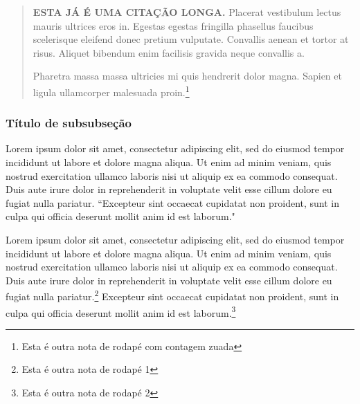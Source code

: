 \documentclass[12pt]{article}
\begin{document}
			\begin{quotation}
				\textbf{ESTA JÁ É UMA CITAÇÃO LONGA.} Placerat vestibulum lectus mauris ultrices eros in. Egestas egestas fringilla phasellus faucibus scelerisque eleifend donec pretium vulputate. Convallis aenean et tortor at risus. Aliquet bibendum enim facilisis gravida neque convallis a. 
				
				Pharetra massa massa ultricies mi quis hendrerit dolor magna. Sapien et ligula ullamcorper malesuada proin.\footnote[516]{Esta é outra nota de rodapé com contagem zuada}
			\end{quotation}
		
			\subsubsection{Título de subsubseção}
				Lorem ipsum dolor sit amet, consectetur adipiscing elit, sed do eiusmod tempor incididunt ut labore et dolore magna aliqua. Ut enim ad minim veniam, quis nostrud exercitation ullamco laboris nisi ut aliquip ex ea commodo consequat. Duis aute irure dolor in reprehenderit in voluptate velit esse cillum dolore eu fugiat nulla pariatur. ``Excepteur sint occaecat cupidatat non proident, sunt in culpa qui officia deserunt mollit anim id est laborum."
				
				Lorem ipsum dolor sit amet, consectetur adipiscing elit, sed do eiusmod tempor incididunt ut labore et dolore magna aliqua. Ut enim ad minim veniam, quis nostrud exercitation ullamco laboris nisi ut aliquip ex ea commodo consequat. Duis aute irure dolor in reprehenderit in voluptate velit esse cillum dolore eu fugiat nulla pariatur.\footnote{Esta é outra nota de rodapé 1} Excepteur sint occaecat cupidatat non proident, sunt in culpa qui officia deserunt mollit anim id est laborum.\footnote{Esta é outra nota de rodapé 2}
				
		\newpage
	\nocite{alchemist_pauloc} %
\end{document}
